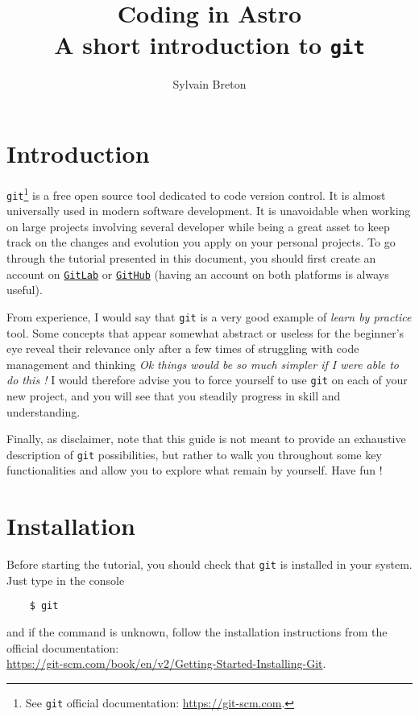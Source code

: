 \documentclass{article}
\title{Coding in Astro \\ A short introduction to \texttt{git}}
\author{Sylvain Breton}
\begin{document}
\lstset{basicstyle = \ttfamily,columns=fullflexible}

\maketitle

\section{Introduction}

\texttt{git}\footnote{See \texttt{git} official documentation: \url{https://git-scm.com}.} is a free open source tool dedicated to code version control. It is almost universally used in modern software development. It is unavoidable when working on large projects involving several developer while being a great asset to keep track on the changes and evolution you apply on your personal projects.
To go through the tutorial presented in this document, you should first create an account on \href{https://gitlab.com/}{\texttt{GitLab}} or \href{https://github.com/}{\texttt{GitHub}} (having an account on both platforms is always useful).

From experience, I would say that \texttt{git} is a very good example of \textit{learn by practice} tool. Some concepts that appear somewhat abstract or useless for the beginner's eye reveal their relevance only after a few times of struggling with code management and thinking \textit{Ok things would be so much simpler if I were able to do this !} I would therefore advise you to force yourself to use \texttt{git} on each of your new project, and you will see that you steadily progress in skill and understanding.

Finally, as disclaimer, note that this guide is not meant to provide an exhaustive description of \texttt{git} possibilities, but rather to walk you throughout some key functionalities and allow you to explore what remain by yourself. Have fun !


\section{Installation}

Before starting the tutorial, you should check that \texttt{git} is installed in your system. Just type in the console
\begin{lstlisting}
    $ git
\end{lstlisting}
and if the command is unknown, follow the installation instructions from the official documentation: \\ \url{https://git-scm.com/book/en/v2/Getting-Started-Installing-Git}.
\end{document}
